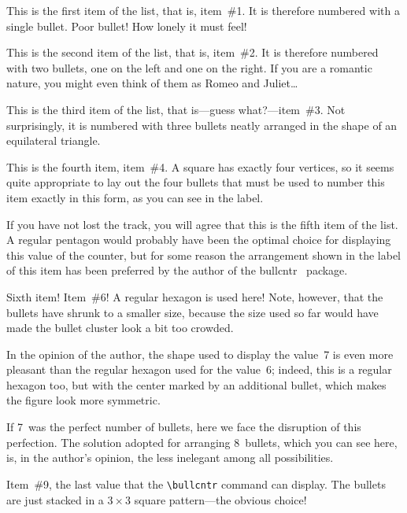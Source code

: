 \documentclass[a4paper]{article}
\DeclareRobustCommand*{\packlass}[1]{%
	{\texorpdfstring{\normalfont \sffamily}{}#1}%
}
\newcommand*{\Bullcntr}{bullcntr}
\newcommand*{\bull}{\packlass{\Bullcntr}}
\newcommand*{\tbull}{the \bull\ package}
\begin{document}
\begin{bullenum}
	\item
		This is the first item of the list, that is, item~\#1.  It is
		therefore numbered with a single bullet.  Poor bullet!  How
		lonely it must feel!

	\item
		This is the second item of the list, that is, item~\#2.  It is
		therefore numbered with two bullets, one on the left and one
		on the right.  If you are a romantic nature, you might even
		think of them as Romeo and Juliet\ldots

	\item\label{Standard-3}
		This is the third item of the list, that is---guess
		what?---item~\#3.  Not surprisingly, it is numbered with three
		bullets neatly arranged in the shape of an equilateral
		triangle.

	\item
		This is the fourth item, item~\#4.  A square has exactly four
		vertices, so it seems quite appropriate to lay out the four
		bullets that must be used to number this item exactly in this
		form, as you can see in the label.

	\item
		If you have not lost the track, you will agree that this is
		the fifth item of the list.  A regular pentagon would probably
		have been the optimal choice for displaying this value of the
		counter, but for some reason the arrangement shown in the
		label of this item has been preferred by the author of \tbull.

	\item\label{Standard-6}
		Sixth item!  Item~\#6!  A regular hexagon is used here!  Note,
		however, that the bullets have shrunk to a smaller size,
		because the size used so far would have made the bullet
		cluster look a bit too crowded.

	\item
		In the opinion of the author, the shape used to display the
		value~7 is even more pleasant than the regular hexagon used
		for the value~6; indeed, this is a regular hexagon too, but
		with the center marked by an additional bullet, which makes
		the figure look more symmetric.

	\item
		If 7~was the perfect number of bullets, here we face the
		disruption of this perfection.  The solution adopted for
		arranging 8~bullets, which you can see here, is, in the
		author's opinion, the less inelegant among all possibilities.

	\item
		Item~\#9, the last value that the \verb|\bullcntr| command can
		display.  The bullets are just stacked in a $3\times3$ square
		pattern---the obvious choice!
\end{bullenum}
\end{document}
